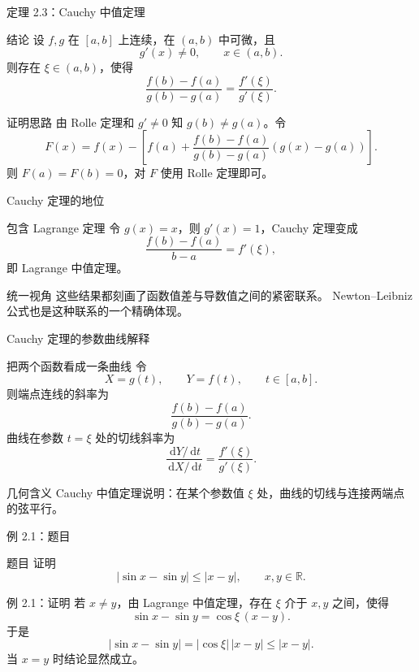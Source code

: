 \documentclass[aspectratio=169,10pt]{ctexbeamer}
\newcommand{\R}{\mathbb{R}}
\newcommand{\dd}{\,\mathrm{d}}
\begin{document}
\begin{frame}{定理 2.3：Cauchy 中值定理}
\small
\begin{block}{结论}
设 $f,g$ 在 $[a,b]$ 上连续，在 $(a,b)$ 中可微，且
\[
  g'(x)\ne0,\qquad x\in(a,b).
\]
则存在 $\xi\in(a,b)$，使得
\[
  \frac{f(b)-f(a)}{g(b)-g(a)}
  =
  \frac{f'(\xi)}{g'(\xi)}.
\]
\end{block}
\begin{block}{证明思路}
由 Rolle 定理和 $g'\ne0$ 知 $g(b)\ne g(a)$。令
\[
  F(x)=f(x)-\left[f(a)+
  \frac{f(b)-f(a)}{g(b)-g(a)}(g(x)-g(a))\right].
\]
则 $F(a)=F(b)=0$，对 $F$ 使用 Rolle 定理即可。
\end{block}
\end{frame}

\begin{frame}{Cauchy 定理的地位}
\small
\begin{block}{包含 Lagrange 定理}
令 $g(x)=x$，则 $g'(x)=1$，Cauchy 定理变成
\[
  \frac{f(b)-f(a)}{b-a}=f'(\xi),
\]
即 Lagrange 中值定理。
\end{block}
\begin{alertblock}{统一视角}
这些结果都刻画了函数值差与导数值之间的紧密联系。
Newton--Leibniz 公式也是这种联系的一个精确体现。
\end{alertblock}
\end{frame}

\begin{frame}{Cauchy 定理的参数曲线解释}
\small
\begin{block}{把两个函数看成一条曲线}
令
\[
  X=g(t),\qquad Y=f(t),\qquad t\in[a,b].
\]
则端点连线的斜率为
\[
  \frac{f(b)-f(a)}{g(b)-g(a)}.
\]
曲线在参数 $t=\xi$ 处的切线斜率为
\[
  \frac{\dd Y/\dd t}{\dd X/\dd t}
  =
  \frac{f'(\xi)}{g'(\xi)}.
\]
\end{block}

\begin{alertblock}{几何含义}
Cauchy 中值定理说明：在某个参数值 $\xi$ 处，曲线的切线与连接两端点的弦平行。
\end{alertblock}
\end{frame}

\begin{frame}{例 2.1：题目}
\small
\begin{block}{题目}
证明
\[
  |\sin x-\sin y|\le |x-y|,\qquad x,y\in\R.
\]
\end{block}
\end{frame}

\begin{frame}{例 2.1：证明}
\small
若 $x\ne y$，由 Lagrange 中值定理，存在 $\xi$ 介于 $x,y$ 之间，使得
\[
  \sin x-\sin y=\cos \xi\,(x-y).
\]
于是
\[
  |\sin x-\sin y|=|\cos\xi|\,|x-y|\le |x-y|.
\]
当 $x=y$ 时结论显然成立。
\end{frame}
\end{document}

